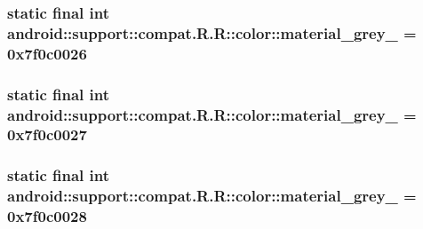 \hypertarget{classandroid_1_1support_1_1compat_1_1_r_1_1color_5f4bc237a2b0045316fe4e008712c864}{
\subsubsection[{material\_\-grey\_\-50}]{\setlength{\rightskip}{0pt plus 5cm}static final int android::support::compat.R.R::color::material\_\-grey\_ = 0x7f0c0026}}
\label{classandroid_1_1support_1_1compat_1_1_r_1_1color_5f4bc237a2b0045316fe4e008712c864}


\hypertarget{classandroid_1_1support_1_1compat_1_1_r_1_1color_dce64b75324c466507d662a57ce782bf}{
\subsubsection[{material\_\-grey\_\-600}]{\setlength{\rightskip}{0pt plus 5cm}static final int android::support::compat.R.R::color::material\_\-grey\_ = 0x7f0c0027}}
\label{classandroid_1_1support_1_1compat_1_1_r_1_1color_dce64b75324c466507d662a57ce782bf}


\hypertarget{classandroid_1_1support_1_1compat_1_1_r_1_1color_34f1d0dd9dac8c159bd49a3d248938ec}{
\subsubsection[{material\_\-grey\_\-800}]{\setlength{\rightskip}{0pt plus 5cm}static final int android::support::compat.R.R::color::material\_\-grey\_ = 0x7f0c0028}}
\label{classandroid_1_1support_1_1compat_1_1_r_1_1color_34f1d0dd9dac8c159bd49a3d248938ec}


